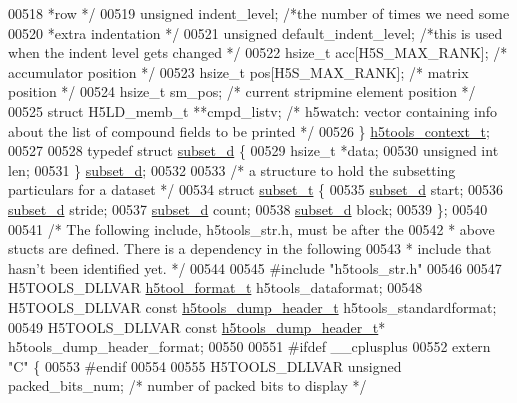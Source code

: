 \begin{DoxyCode}
{{{{{{{{{{{{{{{{{{{00518 \textcolor{comment}{                                              *row */}
00519     \textcolor{keywordtype}{unsigned}  indent\_level;                \textcolor{comment}{/*the number of times we need some}
00520 \textcolor{comment}{                                       *extra indentation */}
00521     \textcolor{keywordtype}{unsigned}  default\_indent\_level;        \textcolor{comment}{/*this is used when the indent level gets changed */}
00522     hsize\_t acc[H5S\_MAX\_RANK];        \textcolor{comment}{/* accumulator position */}
00523     hsize\_t pos[H5S\_MAX\_RANK];        \textcolor{comment}{/* matrix position */}
00524     hsize\_t sm\_pos;                   \textcolor{comment}{/* current stripmine element position */}
00525     \textcolor{keyword}{struct }H5LD\_memb\_t **cmpd\_listv;  \textcolor{comment}{/* h5watch: vector containing info about the list of compound fields
       to be printed */}
00526 \} \hyperlink{structh5tools__context__t}{h5tools\_context\_t};
00527 
00528 \textcolor{keyword}{typedef} \textcolor{keyword}{struct }\hyperlink{structsubset__d}{subset\_d} \{
00529     hsize\_t     *data;
00530     \textcolor{keywordtype}{unsigned} \textcolor{keywordtype}{int} len;
00531 \} \hyperlink{structsubset__d}{subset\_d};
00532 
00533 \textcolor{comment}{/* a structure to hold the subsetting particulars for a dataset */}
00534 \textcolor{keyword}{struct }\hyperlink{structsubset__t}{subset\_t} \{
00535     \hyperlink{structsubset__d}{subset\_d} start;
00536     \hyperlink{structsubset__d}{subset\_d} stride;
00537     \hyperlink{structsubset__d}{subset\_d} count;
00538     \hyperlink{structsubset__d}{subset\_d} block;
00539 \};
00540 
00541 \textcolor{comment}{/* The following include, h5tools\_str.h, must be after the}
00542 \textcolor{comment}{ * above stucts are defined. There is a dependency in the following}
00543 \textcolor{comment}{ * include that hasn't been identified yet. */}
00544 
00545 \textcolor{preprocessor}{#include "h5tools\_str.h"}
00546 
00547 H5TOOLS\_DLLVAR \hyperlink{structh5tool__format__t}{h5tool\_format\_t} h5tools\_dataformat;
00548 H5TOOLS\_DLLVAR \textcolor{keyword}{const} \hyperlink{structh5tools__dump__header__t}{h5tools\_dump\_header\_t} h5tools\_standardformat;
00549 H5TOOLS\_DLLVAR \textcolor{keyword}{const} \hyperlink{structh5tools__dump__header__t}{h5tools\_dump\_header\_t}* h5tools\_dump\_header\_format;
00550 
00551 \textcolor{preprocessor}{#ifdef \_\_cplusplus}
00552 \textcolor{keyword}{extern} \textcolor{stringliteral}{"C"} \{
00553 \textcolor{preprocessor}{#endif}
00554 
00555 H5TOOLS\_DLLVAR \textcolor{keywordtype}{unsigned} packed\_bits\_num;    \textcolor{comment}{/* number of packed bits to display */}
}}}}}}}}}}}}}}}}}}}
\end{DoxyCode}
